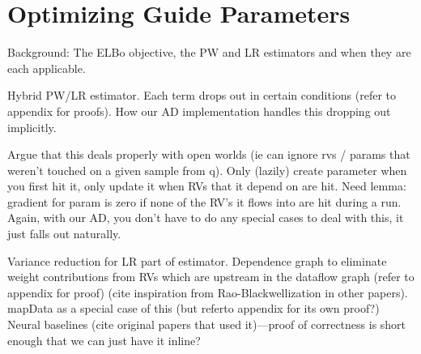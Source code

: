 \section{Optimizing Guide Parameters}
\label{sec:optimization}

Background: The ELBo objective, the PW and LR estimators and when they are each applicable.

Hybrid PW/LR estimator. Each term drops out in certain conditions (refer to appendix for proofs). How our AD implementation handles this dropping out implicitly.

Argue that this deals properly with open worlds (ie can ignore rvs / params that weren’t touched on a given sample from q). Only (lazily) create parameter when you first hit it, only update it when RVs that it depend on are hit. Need lemma: gradient for param is zero if none of the RV’s it flows into are hit during a run. Again, with our AD, you don’t have to do any special cases to deal with this, it just falls out naturally.

Variance reduction for LR part of estimator. Dependence graph to eliminate weight contributions from RVs which are upstream in the dataflow graph (refer to appendix for proof) (cite inspiration from Rao-Blackwellization in other papers). mapData as a special case of this (but referto appendix for its own proof?) Neural baselines (cite original papers that used it)---proof of correctness is short enough that we can just have it inline?

